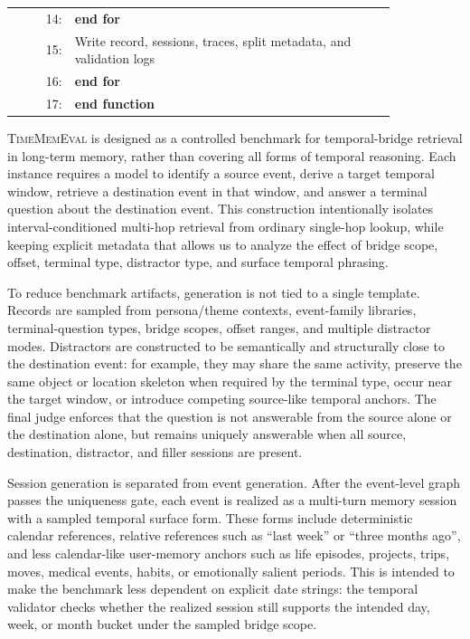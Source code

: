 \begin{tcolorbox}
\begin{tabular}{@{}r@{\quad}p{0.84\linewidth}@{}}
  14: & \hspace*{2em}\textbf{end for} \\
  15: & \hspace*{2em}Write record, sessions, traces, split metadata, and validation logs \\
  16: & \hspace*{1em}\textbf{end for} \\
  17: & \textbf{end function}
  \end{tabular}
  \end{tcolorbox}

  \textsc{TimeMemEval} is designed as a controlled benchmark for temporal-bridge
  retrieval in long-term memory, rather than covering all forms of
  temporal reasoning. Each instance requires a model to identify a source event,
  derive a target temporal window, retrieve a destination event in that window,
  and answer a terminal question about the destination event. This construction
  intentionally isolates interval-conditioned multi-hop retrieval from ordinary
  single-hop lookup, while keeping explicit metadata that allows us to analyze the
  effect of bridge scope, offset, terminal type, distractor type, and surface
  temporal phrasing.

  To reduce benchmark artifacts, generation is not tied to a single template.
  Records are sampled from persona/theme contexts, event-family libraries,
  terminal-question types, bridge scopes, offset ranges, and multiple distractor
  modes. Distractors are constructed to be semantically and structurally close to
  the destination event: for example, they may share the same activity, preserve
  the same object or location skeleton when required by the terminal type, occur
  near the target window, or introduce competing source-like temporal anchors.
  The final judge enforces that the question is not answerable from the source
  alone or the destination alone, but remains uniquely answerable when all source,
  destination, distractor, and filler sessions are present.

  Session generation is separated from event generation. After the event-level
  graph passes the uniqueness gate, each event is realized as a multi-turn memory
  session with a sampled temporal surface form. These forms include deterministic
  calendar references, relative references such as ``last week'' or ``three months
  ago'', and less calendar-like user-memory anchors such as life episodes,
  projects, trips, moves, medical events, habits, or emotionally salient periods.
  This is intended to make the benchmark less dependent on explicit date strings:
  the temporal validator checks whether the realized session still supports the
  intended day, week, or month bucket under the sampled bridge scope.

